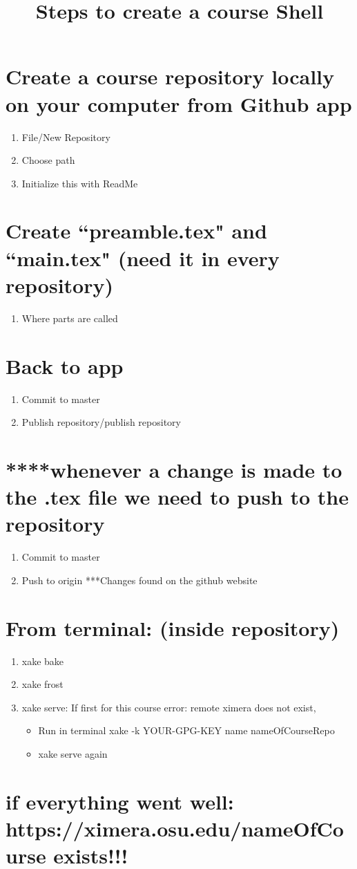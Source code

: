 \documentclass{ximera}
\title{Steps to create a course Shell }
\begin{document}
\begin{abstract}
\end{abstract}
\maketitle

\section{Create a course repository locally on your computer from Github app}
\begin{enumerate}
\item File/New Repository
\item	Choose path
\item Initialize this with ReadMe
\end{enumerate}

\section{Create ``preamble.tex" and ``main.tex" (need it in every repository)}
\begin{enumerate}
\item Where parts are called
\end{enumerate}

\section{Back to app}
\begin{enumerate}
\item Commit to master
\item Publish repository/publish repository   
\end{enumerate}

\section{****whenever a change is made to the .tex file we need to push to the repository}
\begin{enumerate}
\item Commit to master
\item Push to origin ***Changes found on the github website
\end{enumerate}

\section{From terminal: (inside repository)}
\begin{enumerate}
\item xake bake
\item	xake frost
\item	xake serve: If first for this course error: remote ximera does not exist,  
\begin{itemize}
\item Run in terminal xake -k YOUR-GPG-KEY name nameOfCourseRepo
\item xake serve again
\end{itemize}
\end{enumerate}

\section{if everything went well: https://ximera.osu.edu/nameOfCourse exists!!!}
\end{document}
